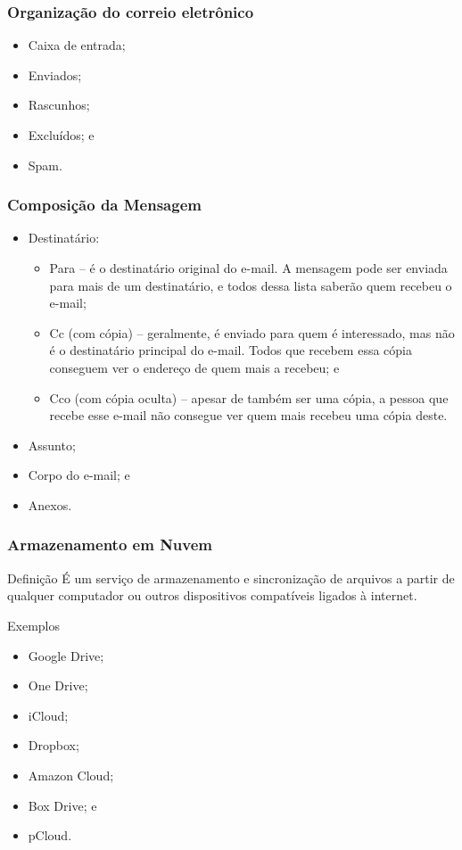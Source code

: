 \documentclass[aspectratio=169]{beamer} %
\begin{document}
\begin{frame}
	\frametitle{Organiza\c cão do correio eletrônico}

	\begin{itemize}
		\item Caixa de entrada;
		\item Enviados;
		\item Rascunhos;
		\item Excluídos; e
		\item Spam.
	\end{itemize}
\end{frame}

\begin{frame}
	\frametitle{Composi\c cão da Mensagem}

	\begin{itemize}
		\item Destinatário:
		\begin{itemize}
			\item Para -- é o destinatário original do e-mail. A mensagem pode ser enviada para mais de um destinatário, e todos dessa lista saberão quem recebeu o e-mail;
			\item Cc (com cópia) -- geralmente, é enviado para quem é interessado, mas não é o destinatário principal do e-mail. Todos que recebem essa cópia conseguem ver o endereço de quem mais a recebeu; e
			\item Cco (com cópia oculta) -- apesar de também ser uma cópia, a pessoa que recebe esse e-mail não consegue ver quem mais recebeu uma cópia deste.
		\end{itemize}
		\item Assunto;
		\item Corpo do e-mail; e
		\item Anexos.
	\end{itemize}
\end{frame}

\begin{frame}
	\frametitle{Armazenamento em Nuvem}

	\begin{block}{Defini\c cão}
		É um serviço de armazenamento e sincronização de arquivos a partir de qualquer computador ou outros dispositivos compatíveis ligados à internet.
	\end{block} \vfill

	\begin{exampleblock}{Exemplos}
		\begin{itemize}
			\item Google Drive;
			\item One Drive;
			\item iCloud; 
			\item Dropbox;
			\item Amazon Cloud;
			\item Box Drive; e
			\item pCloud.
		\end{itemize}
	\end{exampleblock}
\end{frame}
\end{document}
